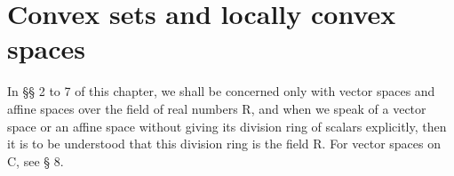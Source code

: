 \chapter{Convex sets and locally convex spaces}

In §§ 2 to 7 of this chapter, we shall be concerned only with vector spaces and affine spaces over the field of real numbers R, and when we speak of a vector space or an affine space without giving its division ring of scalars explicitly, then it is to be understood that this division ring is the field R. For vector spaces on C, see § 8.

